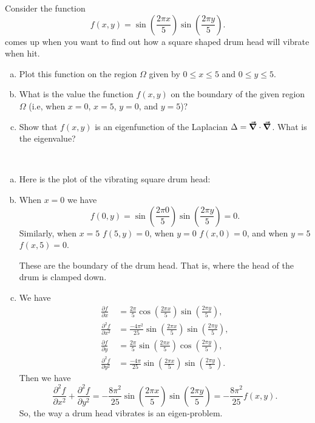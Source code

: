 \documentclass[12pt]{article} %
\begin{document}
\newpage
\begin{problem}
Consider the function
\[
f(x,y)=\sin\left(\frac{2\pi x}{5}\right)\sin\left(\frac{2\pi y}{5}\right).
\]
comes up when you want to find out how a square shaped drum head will vibrate when hit. 
\begin{enumerate}[(a)]
    \item Plot this function on the region $\Omega$ given by $0\leq x \leq 5$ and $0\leq y \leq 5$.  
    \item What is the value the function $f(x,y)$ on the boundary of the given region $\Omega$ (i.e, when $x=0$, $x=5$, $y=0$, and $y=5$)?
    \item Show that $f(x,y)$ is an eigenfunction of the Laplacian $\Delta = \boldsymbol{\vec{\nabla}} \cdot \boldsymbol{\vec{\nabla}}$. What is the eigenvalue?
\end{enumerate}
\end{problem}
\begin{solution}~
\begin{enumerate}[(a)]
    \item Here is the plot of the vibrating square drum head:
    \begin{figure}[H]
        \centering
	\def\svgwidth{0.75\columnwidth}
	
    \end{figure}
    \item When $x=0$ we have
    \[
    f(0,y) = \sin\left( \frac{2\pi 0}{5}\right) \sin\left(\frac{2\pi y}{5}\right) = 0.
    \]
    Similarly, when $x=5$ $f(5,y)=0$, when $y=0$ $f(x,0)=0$, and when $y=5$ $f(x,5)=0$. 
    
    These are the boundary of the drum head.  That is, where the head of the drum is clamped down.
    
    \item We have
    \begin{align*}
        \frac{\partial f}{\partial x} &= \frac{2\pi}{5} \cos \left( \frac{2\pi x}{5} \right) \sin \left( \frac{2\pi y}{5} \right),\\
        \frac{\partial^2 f}{\partial x^2} &= \frac{-4\pi^2}{25} \sin \left( \frac{2\pi x}{5} \right) \sin \left( \frac{2\pi y}{5} \right),\\
        \frac{\partial f}{\partial y} &= \frac{2\pi}{5} \sin \left( \frac{2\pi x}{5} \right) \cos \left( \frac{2\pi y}{5} \right),\\
        \frac{\partial^2 f}{\partial y^2} &= \frac{-4\pi}{25} \sin \left( \frac{2\pi x}{5} \right) \sin \left( \frac{2\pi y}{5} \right).
    \end{align*}
    Then we have
    \[
    \frac{\partial^2 f}{\partial x^2} + \frac{\partial^2 f}{\partial y^2} = -\frac{8\pi^2}{25} \sin \left( \frac{2\pi x}{5} \right) \sin \left( \frac{2\pi y}{5} \right) = -\frac{8\pi^2}{25} f(x,y).
    \]
    So, the way a drum head vibrates is an eigen-problem.
\end{enumerate}
\end{solution}
\end{document}
